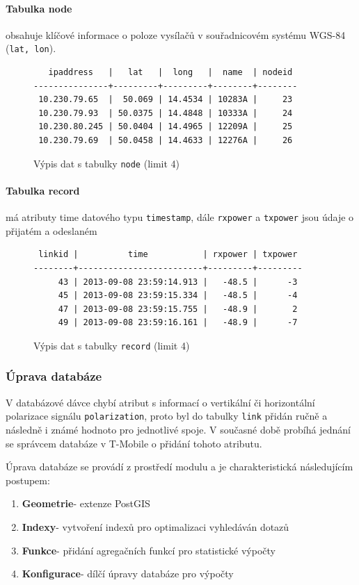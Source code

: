\documentclass[a4paper,12pt,oneside]{report}
\begin{document}
\paragraph*{Tabulka node} obsahuje klíčové informace o poloze vysílačů v souřadnicovém systému WGS-84 (\texttt{lat, lon}).

\begin{figure}[h!]
\centering
\footnotesize
\begin{BVerbatim}
   ipaddress   |   lat   |  long   |  name  | nodeid 
---------------+---------+---------+--------+--------
 10.230.79.65  |  50.069 | 14.4534 | 10283A |     23
 10.230.79.93  | 50.0375 | 14.4848 | 10333A |     24
 10.230.80.245 | 50.0404 | 14.4965 | 12209A |     25
 10.230.79.69  | 50.0458 | 14.4633 | 12276A |     26
\end{BVerbatim}
\caption{Výpis dat s tabulky  \texttt{node} (limit 4)}
\end{figure}

\paragraph*{Tabulka record} má atributy time datového typu \texttt{timestamp}, dále \texttt{rxpower} a \texttt{txpower} jsou údaje o přijatém a odeslaném 

\begin{figure}[h!]
\centering
\footnotesize
\begin{BVerbatim}
 linkid |          time           | rxpower | txpower 
--------+-------------------------+---------+---------
     43 | 2013-09-08 23:59:14.913 |   -48.5 |      -3
     45 | 2013-09-08 23:59:15.334 |   -48.5 |      -4
     47 | 2013-09-08 23:59:15.755 |   -48.9 |       2
     49 | 2013-09-08 23:59:16.161 |   -48.9 |      -7
\end{BVerbatim}
\caption{Výpis dat s tabulky \texttt{record} (limit 4) }
\end{figure}


\subsubsection*{Úprava databáze}
\label{subsubsec:upravadatabaze}  
 V databázové dávce chybí atribut s informací o vertikální či horizontální polarizace signálu \texttt{polarization}, proto byl do tabulky \texttt{link} přidán ručně a následně i známé hodnoto pro jednotlivé spoje. V současné době probíhá jednání se správcem databáze v T-Mobile o přidání tohoto atributu.
 
Úprava databáze se provádí z prostředí modulu a je charakteristická následujícím postupem:
\begin{enumerate}
\item \textbf{Geometrie}- extenze PostGIS
\item \textbf{Indexy}- vytvoření indexů pro optimalizaci vyhledáván dotazů
\item \textbf{Funkce}- přidání agregačních funkcí pro statistické výpočty
\item \textbf{Konfigurace}- dílčí úpravy databáze pro výpočty
\end{enumerate}
\end{document}

